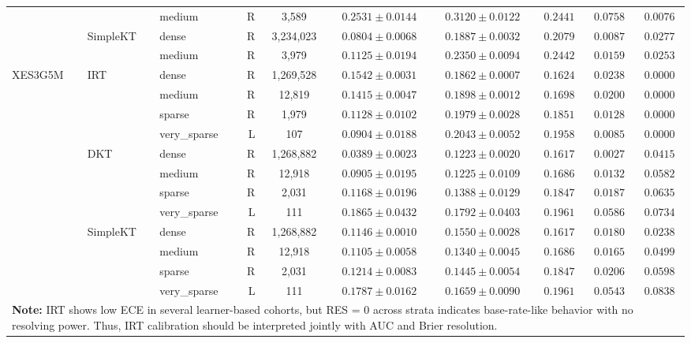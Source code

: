 \begin{table}[H]
{\begin{tabular}{lllrcccccc}
 &  & medium & R & 3,589 & $0.2531 \pm 0.0144$ & $0.3120 \pm 0.0122$ & $0.2441$ & $0.0758$ & $0.0076$ \\
 & SimpleKT & dense & R & 3,234,023 & $0.0804 \pm 0.0068$ & $0.1887 \pm 0.0032$ & $0.2079$ & $0.0087$ & $0.0277$ \\
 &  & medium & R & 3,979 & $0.1125 \pm 0.0194$ & $0.2350 \pm 0.0094$ & $0.2442$ & $0.0159$ & $0.0253$ \\
\midrule
XES3G5M & IRT & dense & R & 1,269,528 & $0.1542 \pm 0.0031$ & $0.1862 \pm 0.0007$ & $0.1624$ & $0.0238$ & $0.0000$ \\
 &  & medium & R & 12,819 & $0.1415 \pm 0.0047$ & $0.1898 \pm 0.0012$ & $0.1698$ & $0.0200$ & $0.0000$ \\
 &  & sparse & R & 1,979 & $0.1128 \pm 0.0102$ & $0.1979 \pm 0.0028$ & $0.1851$ & $0.0128$ & $0.0000$ \\
 &  & very\_sparse & L & 107 & $0.0904 \pm 0.0188$ & $0.2043 \pm 0.0052$ & $0.1958$ & $0.0085$ & $0.0000$ \\
 & DKT & dense & R & 1,268,882 & $0.0389 \pm 0.0023$ & $0.1223 \pm 0.0020$ & $0.1617$ & $0.0027$ & $0.0415$ \\
 &  & medium & R & 12,918 & $0.0905 \pm 0.0195$ & $0.1225 \pm 0.0109$ & $0.1686$ & $0.0132$ & $0.0582$ \\
 &  & sparse & R & 2,031 & $0.1168 \pm 0.0196$ & $0.1388 \pm 0.0129$ & $0.1847$ & $0.0187$ & $0.0635$ \\
 &  & very\_sparse & L & 111 & $0.1865 \pm 0.0432$ & $0.1792 \pm 0.0403$ & $0.1961$ & $0.0586$ & $0.0734$ \\
 & SimpleKT & dense & R & 1,268,882 & $0.1146 \pm 0.0010$ & $0.1550 \pm 0.0028$ & $0.1617$ & $0.0180$ & $0.0238$ \\
 &  & medium & R & 12,918 & $0.1105 \pm 0.0058$ & $0.1340 \pm 0.0045$ & $0.1686$ & $0.0165$ & $0.0499$ \\
 &  & sparse & R & 2,031 & $0.1214 \pm 0.0083$ & $0.1445 \pm 0.0054$ & $0.1847$ & $0.0206$ & $0.0598$ \\
 &  & very\_sparse & L & 111 & $0.1787 \pm 0.0162$ & $0.1659 \pm 0.0090$ & $0.1961$ & $0.0543$ & $0.0838$ \\
\bottomrule
\multicolumn{10}{p{17.5cm}}{\scriptsize \textbf{Note:} IRT shows low ECE in several learner-based cohorts, but RES = 0 across strata indicates base-rate-like behavior with no resolving power. Thus, IRT calibration should be interpreted jointly with AUC and Brier resolution.} \\
\end{tabular}%
}
\end{table}
